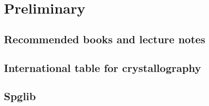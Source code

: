 \section{\label{sec:preliminary}Preliminary}

\subsection{Recommended books and lecture notes}

\subsection{International table for crystallography}

\subsection{Spglib}
